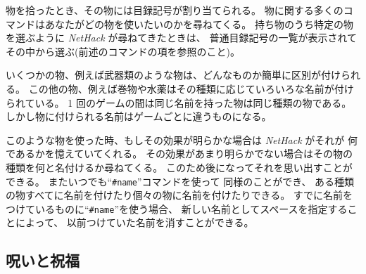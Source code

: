 物を拾ったとき、その物には目録記号が割り当てられる。
物に関する多くのコマンドはあなたがどの物を使いたいのかを尋ねてくる。
持ち物のうち特定の物を選ぶように {\it NetHack\/} が尋ねてきたときは、
普通目録記号の一覧が表示されてその中から選ぶ(前述のコマンドの項を参照のこと)。

いくつかの物、例えば武器類のような物は、どんなものか簡単に区別が付けられる。
この他の物、例えば巻物や水薬はその種類に応じていろいろな名前が付けられている。
1 回のゲームの間は同じ名前を持った物は同じ種類の物である。
しかし物に付けられる名前はゲームごとに違うものになる。

このような物を使った時、もしその効果が明らかな場合は {\it NetHack\/} がそれが
何であるかを憶えていてくれる。
その効果があまり明らかでない場合はその物の種類を何と名付けるか尋ねてくる。
このため後になってそれを思い出すことができる。
またいつでも``{\tt \#name}''コマンドを使って
同様のことができ、
ある種類の物すべてに名前を付けたり個々の物に名前を付けたりできる。
すでに名前をつけているものに``{\tt \#name}''を使う場合、
新しい名前としてスペースを指定することによって、
以前つけていた名前を消すことができる。

\subsection*{呪いと祝福}

